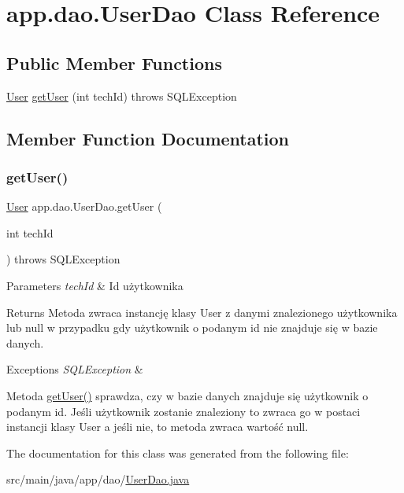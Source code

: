 \hypertarget{classapp_1_1dao_1_1_user_dao}{}\section{app.\+dao.\+User\+Dao Class Reference}
\label{classapp_1_1dao_1_1_user_dao}
\subsection*{Public Member Functions}
\begin{DoxyCompactItemize}
\item 
\mbox{\hyperlink{classapp_1_1entity_1_1_user}{User}} \mbox{\hyperlink{classapp_1_1dao_1_1_user_dao_af6ea8a98c1f57b095fd21cdd1ccde027}{get\+User}} (int tech\+Id)  throws S\+Q\+L\+Exception 
\end{DoxyCompactItemize}


\subsection{Member Function Documentation}
\mbox{\label{classapp_1_1dao_1_1_user_dao_af6ea8a98c1f57b095fd21cdd1ccde027}} 
\subsubsection{\texorpdfstring{getUser()}{getUser()}}
{\footnotesize\ttfamily \mbox{\hyperlink{classapp_1_1entity_1_1_user}{User}} app.\+dao.\+User\+Dao.\+get\+User (\begin{DoxyParamCaption}\item[{int}]{tech\+Id }\end{DoxyParamCaption}) throws S\+Q\+L\+Exception}


\begin{DoxyParams}{Parameters}
{\em tech\+Id} & Id użytkownika \\
\hline
\end{DoxyParams}
\begin{DoxyReturn}{Returns}
Metoda zwraca instancję klasy User z danymi znalezionego użytkownika lub null w przypadku gdy użytkownik o podanym id nie znajduje się w bazie danych. 
\end{DoxyReturn}

\begin{DoxyExceptions}{Exceptions}
{\em S\+Q\+L\+Exception} & \\
\hline
\end{DoxyExceptions}
Metoda \mbox{\hyperlink{classapp_1_1dao_1_1_user_dao_af6ea8a98c1f57b095fd21cdd1ccde027}{get\+User()}} sprawdza, czy w bazie danych znajduje się użytkownik o podanym id. Jeśli użytkownik zostanie znaleziony to zwraca go w postaci instancji klasy User a jeśli nie, to metoda zwraca wartość null. 

The documentation for this class was generated from the following file\+:\begin{DoxyCompactItemize}
\item 
src/main/java/app/dao/\mbox{\hyperlink{_user_dao_8java}{User\+Dao.\+java}}\end{DoxyCompactItemize}
